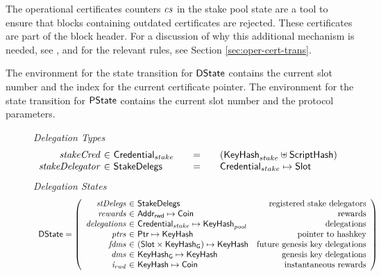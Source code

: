 The operational certificates counters $\mathit{cs}$ in the stake pool state are a
tool to ensure that blocks containing outdated certificates are rejected.
These certificates are part of the block header.
For a discussion of why this additional mechanism is needed,
see \cite{delegation_design}, and for
the relevant rules, see Section \ref{sec:oper-cert-trans}.

The environment for the state transition for $\mathsf{DState}$ contains the current slot number
and the index for the current certificate pointer.
The environment for the state transition for $\mathsf{PState}$ contains the current slot number
and the protocol parameters.

\begin{figure}
  \emph{Delegation Types}
  \begin{equation*}
    \begin{array}{r@{~\in~}l@{\qquad=\qquad}lr}
      \var{stakeCred} & \StakeCredential & (\KeyHash_{stake} \uniondistinct
                                       \HashScr) \\
      \var{stakeDelegator} & \StakeDelegs & \StakeCredential \mapsto \Slot \\
    \end{array}
  \end{equation*}
  \emph{Delegation States}
  \begin{equation*}
    \begin{array}{l}
    \DState =
    \left(\begin{array}{r@{~\in~}lr}
            \var{stDelegs} & \StakeDelegs & \text{registered stake delegators}\\
            \var{rewards} & \AddrRWD \mapsto \Coin & \text{rewards}\\
            \var{delegations} & \StakeCredential \mapsto \KeyHash_{pool} & \text{delegations}\\
            \var{ptrs} & \Ptr \mapsto \KeyHash & \text{pointer to hashkey}\\
            \var{fdms} & (\Slot\times\KeyHashGen) \mapsto \KeyHash & \text{future genesis key delegations}\\
            \var{dms} & \KeyHashGen \mapsto \KeyHash & \text{genesis key delegations}\\
            \var{i_{rwd}} & \KeyHash \mapsto \Coin & \text{instantaneous rewards}\\
          \end{array}
      \right)
      \\

\end{array}
\end{equation*}
\end{figure}
